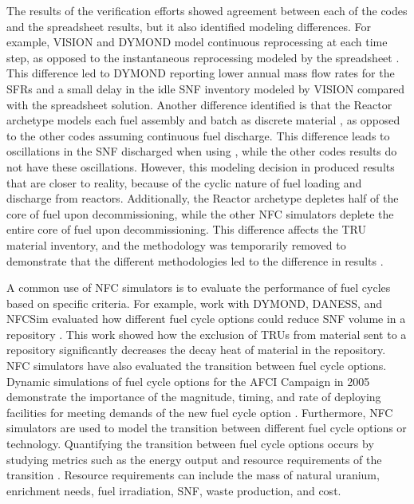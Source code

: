 The results of the verification efforts showed agreement between each 
of the codes and the spreadsheet results, but it also identified modeling 
differences. For example, \gls{VISION} and \gls{DYMOND} model continuous 
reprocessing at each time step, as opposed to the instantaneous 
reprocessing modeled by the spreadsheet \cite{feng_standardized_2016}. 
This difference led to \gls{DYMOND} reporting lower annual mass flow 
rates for the \glspl{SFR} and a small delay in the idle \gls{SNF} 
inventory modeled by \gls{VISION} compared with the spreadsheet 
solution. 
Another difference identified is that the \Cycamore Reactor 
archetype models each fuel assembly and batch as discrete material 
\cite{bae_standardized_2019}, as 
opposed to the other codes assuming continuous fuel discharge. 
This difference leads to oscillations in the \gls{SNF} discharged 
when using \Cyclus, while the other codes results do not have these 
oscillations.
However, this modeling decision in \Cyclus produced results that 
are closer to reality, because of the cyclic nature of fuel 
loading and discharge from reactors. 
Additionally, the \Cycamore Reactor archetype depletes half of the 
core of fuel upon decommissioning, while the other \gls{NFC} simulators 
deplete the entire core of fuel upon decommissioning. This 
difference affects the \gls{TRU} material inventory, and the 
methodology was 
temporarily removed to demonstrate that the different 
methodologies led to the difference in results \cite{bae_standardized_2019}.

A common use of \gls{NFC} simulators is to evaluate the performance 
of fuel cycles based on specific criteria. 
For example, work with \gls{DYMOND}, \gls{DANESS}, 
and \gls{NFCSim} evaluated how different fuel cycle options 
could reduce \gls{SNF} volume in a repository \cite{yacout_dynamic_2004}. 
This work showed how the exclusion of \glspl{TRU} from material 
sent to a repository significantly decreases the decay heat 
of material in the repository. 
\gls{NFC} simulators have also evaluated the transition between fuel cycle 
options. Dynamic simulations of fuel cycle options for the \gls{AFCI}
Campaign in 2005 demonstrate the importance of the magnitude, timing, 
and rate of deploying facilities for meeting demands of the new fuel cycle option 
\cite{piet_assessment_2011}. Furthermore, \gls{NFC} simulators are 
used to model the transition between 
different fuel cycle options or technology. Quantifying the transition 
between fuel cycle options occurs by studying metrics such as the 
energy output and resource requirements of the transition 
\cite{del_cul_advanced_2010}. 
Resource requirements can include the mass of natural uranium, enrichment 
needs, fuel irradiation, \gls{SNF}, waste production, and cost. 

